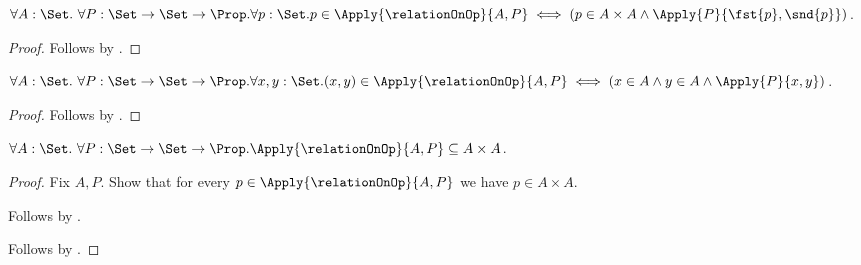 \begin{proposition}\label{logical_relation_on_element}
    $\forall A:\Set.\ \forall P:\Set\to\Set\to\Prop.
     \forall p:\Set.
        p\in\Apply{\relationOnOp}{A,P}
        \iff
        (p\in A\times A\land
            \Apply{P}{\fst{p},\snd{p}})$.
\end{proposition}
\begin{proof}
    Follows by
        .
\end{proof}

\begin{proposition}\label{logical_relation_on_membership}
    $\forall A:\Set.\ \forall P:\Set\to\Set\to\Prop.
     \forall x,y:\Set.
        (x,y)\in\Apply{\relationOnOp}{A,P}
        \iff
        (x\in A\land y\in A\land\Apply{P}{x,y})$.
\end{proposition}
\begin{proof}
    Follows by
        .
\end{proof}

\begin{proposition}\label{logical_relation_on_subseteq}
    $\forall A:\Set.\ \forall P:\Set\to\Set\to\Prop.
        \Apply{\relationOnOp}{A,P}\subseteq A\times A$.
\end{proposition}
\begin{proof}
    Fix $A,P$.
    Show that for every $p\in\Apply{\relationOnOp}{A,P}$
        we have $p\in A\times A$.
    \begin{subproof}
        Follows by .
    \end{subproof}
    Follows by .
\end{proof}
